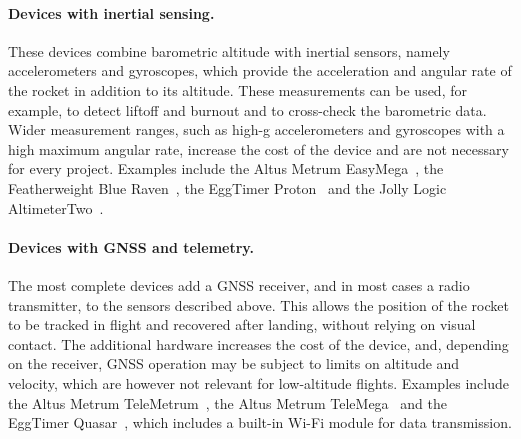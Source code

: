 \paragraph{Devices with inertial sensing.} These devices combine barometric altitude with inertial sensors, namely accelerometers and gyroscopes, which provide the acceleration and angular rate of the rocket in addition to its altitude. These measurements can be used, for example, to detect liftoff and burnout and to cross-check the barometric data. Wider measurement ranges, such as high-g accelerometers and gyroscopes with a high maximum angular rate, increase the cost of the device and are not necessary for every project. Examples include the Altus Metrum EasyMega~\cite{altus:easymega}, the Featherweight Blue Raven~\cite{featherweight:blueraven}, the EggTimer Proton~\cite{eggtimer:proton} and the Jolly Logic AltimeterTwo~\cite{jollylogic:altimetertwo}.

\paragraph{Devices with GNSS and telemetry.} The most complete devices add a GNSS receiver, and in most cases a radio transmitter, to the sensors described above. This allows the position of the rocket to be tracked in flight and recovered after landing, without relying on visual contact. The additional hardware increases the cost of the device, and, depending on the receiver, GNSS operation may be subject to limits on altitude and velocity, which are however not relevant for low-altitude flights.
Examples include the Altus Metrum TeleMetrum~\cite{altus:telemetrum}, the Altus Metrum TeleMega~\cite{altus:telemega} and the EggTimer Quasar~\cite{eggtimer:quasar}, which includes a built-in Wi-Fi module for data transmission.

